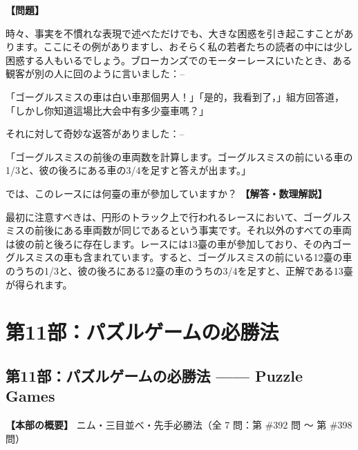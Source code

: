 \documentclass[10pt,a4paper,oneside,openany]{ltjsbook}
\begin{document}
\begin{tcolorbox}[colback=softblue,colframe=primaryblue,title=\textbf{第 391 問：モーターレースのパズル （原題: THE MOTOR-CAR RACE.）},arc=2mm,boxrule=1pt,breakable]
\textbf{【問題】}\par\vspace{0.3em}
時々、事実を不慣れな表現で述べただけでも、大きな困惑を引き起こすことがあります。ここにその例がありますし、おそらく私の若者たちの読者の中には少し困惑する人もいるでしょう。ブローカンズでのモーターレースにいたとき、ある観客が別の人に回のように言いました：--

「ゴーグルスミスの車は白い車那個男人！」「是的，我看到了，」組方回答道，「しかし你知道這場比大会中有多少臺車嗎？」

それに対して奇妙な返答がありました：--

「ゴーグルスミスの前後の車両数を計算します。ゴーグルスミスの前にいる車の1/3と、彼の後ろにある車の3/4を足すと答えが出ます。」

では、このレースには何臺の車が參加していますか？
\tcblower
\textbf{【解答・数理解説】}\par\vspace{0.3em}
最初に注意すべきは、円形のトラック上で行われるレースにおいて、ゴーグルスミスの前後にある車両数が同じであるという事実です。それ以外のすべての車両は彼の前と後ろに存在します。レースには13臺の車が參加しており、その內ゴーグルスミスの車も含まれています。すると、ゴーグルスミスの前にいる12臺の車のうちの1/3と、彼の後ろにある12臺の車のうちの3/4を足すと、正解である13臺が得られます。
\end{tcolorbox}

\part{第11部：パズルゲームの必勝法}
\chapter*{第11部：パズルゲームの必勝法 —— Puzzle Games}

\textbf{【本部の概要】} ニム・三目並べ・先手必勝法（全 7 問：第 \#392 問 〜 第 \#398 問）

\vspace{1em}
\end{document}
